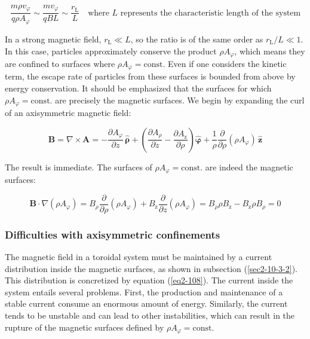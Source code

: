 \begin{equation}
    \frac{m\rho v_\varphi}{q\rho A_\varphi}\sim\frac{mv_\varphi}{qBL}\sim\frac{r_\text{L}}{L}\quad\text{where }L\text{ represents the characteristic length of the system}
\end{equation}

In a strong magnetic field, $r_\text{L}\ll L$, so the ratio is of the same order as $r_\text{L}/L\ll1$. In this case, particles approximately conserve the product $\rho A_\varphi$, which means they are confined to surfaces where $\rho A_\varphi=\text{const.}$ Even if one considers the kinetic term, the escape rate of particles from these surfaces is bounded from above by energy conservation. It should be emphasized that the surfaces for which $\rho A_\varphi=\text{const.}$ are precisely the magnetic surfaces. We begin by expanding the curl of an axisymmetric magnetic field:

\begin{equation}
    \mathbf{B}=\nabla\times\mathbf{A}=-\frac{\partial A_\varphi}{\partial z}\,\boldsymbol{\hat{\rho}}+\left(\frac{\partial A_\rho}{\partial z}-\frac{\partial A_\text{z}}{\partial\rho}\right)\boldsymbol{\hat{\varphi}}+\frac{1}{\rho}\frac{\partial}{\partial\rho}(\rho A_\varphi)\,\mathbf{\hat{z}}
\end{equation}

The result is immediate. The surfaces of $\rho A_\varphi=\text{const.}$ are indeed the magnetic surfaces:

\begin{equation}
    \mathbf{B}\cdot\nabla(\rho A_\varphi)=B_\rho\frac{\partial}{\partial\rho}\left(\rho A_\varphi\right)+B_\text{z}\frac{\partial}{\partial z}(\rho A_\varphi)=B_\rho\rho B_\text{z}-B_\text{z}\rho B_\rho=0 
\end{equation}

\subsubsection{Difficulties with axisymmetric confinements}

The magnetic field in a toroidal system must be maintained by a current distribution inside the magnetic surfaces, as shown in subsection (\ref{sec2-10-3-2}). This distribution is concretized by equation (\ref{eq2-108}). The current inside the system entails several problems. First, the production and maintenance of a stable current consume an enormous amount of energy. Similarly, the current tends to be unstable and can lead to other instabilities, which can result in the rupture of the magnetic surfaces defined by $\rho A_\varphi=\text{const}$.